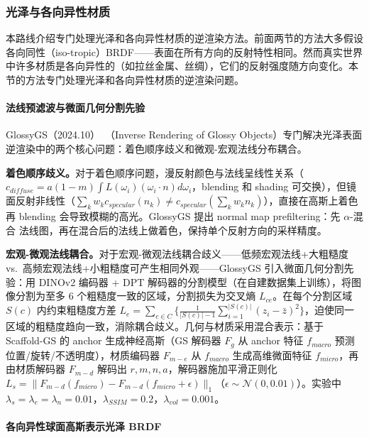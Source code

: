 \subsubsection{光泽与各向异性材质}

本路线介绍专门处理光泽和各向异性材质的逆渲染方法。前面两节的方法大多假设各向同性（iso-tropic）BRDF——表面在所有方向的反射特性相同。然而真实世界中许多材质是各向异性的（如拉丝金属、丝绸），它们的反射强度随方向变化。本节的方法专门处理光泽和各向异性材质的逆渲染问题。

\paragraph{法线预滤波与微面几何分割先验}

GlossyGS（2024.10）~\cite{2410_13349}（Inverse Rendering of Glossy Objects）专门解决光泽表面逆渲染中的两个核心问题：着色顺序歧义和微观-宏观法线分布耦合。

\textbf{着色顺序歧义。}对于着色顺序问题，漫反射颜色与法线呈线性关系（$c_{diffuse} = a(1-m)\int L(\omega_i)(\omega_i \cdot n) d\omega_i$，blending 和 shading 可交换），但镜面反射非线性（$\sum_k w_k c_{specular}(n_k) \neq c_{specular}(\sum_k w_k n_k)$），直接在高斯上着色再 blending 会导致模糊的高光。GlossyGS 提出 normal map prefiltering：先 $\alpha$-混合 法线图，再在混合后的法线上做着色，保持单个反射方向的采样精度。

\textbf{宏观-微观法线耦合。}对于宏观-微观法线耦合歧义——低频宏观法线+大粗糙度 vs.\ 高频宏观法线+小粗糙度可产生相同外观——GlossyGS 引入微面几何分割先验：用 DINOv2 编码器 + DPT 解码器的分割模型（在自建数据集上训练），将图像分割为至多 6 个粗糙度一致的区域，分割损失为交叉熵 $L_{ce}$。在每个分割区域 $S(c)$ 内约束粗糙度方差 $L_e = \sum_{c \in C}\{\frac{1}{|S(c)|-1}\sum_{i=1}^{|S(c)|}(z_i - \bar{z})^2\}$，迫使同一区域的粗糙度趋向一致，消除耦合歧义。几何与材质采用混合表示：基于 Scaffold-GS 的 anchor 生成神经高斯（GS 解码器 $F_g$ 从 anchor 特征 $f_{macro}$ 预测位置/旋转/不透明度），材质编码器 $F_{m-e}$ 从 $f_{macro}$ 生成高维微面特征 $f_{micro}$，再由材质解码器 $F_{m-d}$ 解码出 $r, m, n, a$，解码器施加平滑正则化 $L_s = \|F_{m-d}(f_{micro}) - F_{m-d}(f_{micro}+\epsilon)\|_1$（$\epsilon \sim \mathcal{N}(0, 0.01)$）。实验中 $\lambda_s=\lambda_e=\lambda_n=0.01$，$\lambda_{SSIM}=0.2$，$\lambda_{vol}=0.001$。

\paragraph{各向异性球面高斯表示光泽 BRDF}

